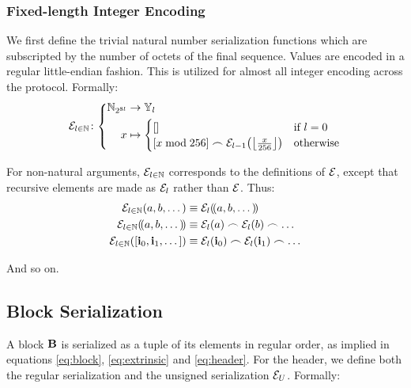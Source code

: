 \subsubsection{Fixed-length Integer Encoding}
We first define the trivial natural number serialization functions which are subscripted by the number of octets of the final sequence. Values are encoded in a regular little-endian fashion. This is utilized for almost all integer encoding across the protocol. Formally:
\begin{equation}
  \fnfixedencode{l \in \N}\colon\abracegroup{
    \Nbits{8l} &\to \bloboflen{l} \\
    x &\mapsto \begin{cases}
      \sq{} &\when l = 0 \\
      \sq{x \bmod 256} \concat \fixedencode{l - 1}{\floor{\frac{x}{256}}} &\otherwise
    \end{cases}
  }
\end{equation}

For non-natural arguments, $\mathcal{E}_{l \in \mathbb{N}}$ corresponds to the definitions of $\mathcal{E}$, except that recursive elements are made as $\mathcal{E}_{l}$ rather than $\mathcal{E}$. Thus:
\begin{align}
  \fixedencode{l \in \N}{a, b, \dots} &\equiv \fixedencode{l}{\tup{a, b, \dots}}\\
  \fixedencode{l \in \N}{\tup{a, b, \dots}} &\equiv \fixedencode{l}{a} \concat \fixedencode{l}{b} \concat \dots\\
  \fixedencode{l \in \N}{\sq{\mathbf{i}_0, \mathbf{i}_1, \dots}} &\equiv \fixedencode{l}{\mathbf{i}_0} \concat \fixedencode{l}{\mathbf{i}_1} \concat \dots
\end{align}

And so on.

\subsection{Block Serialization}

A block $\mathbf{B}$ is serialized as a tuple of its elements in regular order, as implied in equations \ref{eq:block}, \ref{eq:extrinsic} and \ref{eq:header}. For the header, we define both the regular serialization and the unsigned serialization $\mathcal{E}_U$. Formally:

